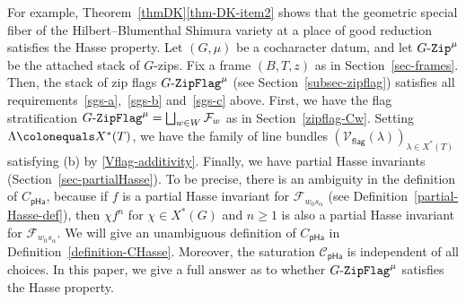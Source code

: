 \documentclass[11pt]{amsart}
\numberwithin{equation}{section}
\theoremstyle{definition}
\theoremstyle{remark}
\newcommand{\GZip}{\mathop{\text{$G$-{\tt Zip}}}\nolimits}
\newcommand{\pha}{\mathsf{pHa}}
\newcommand{\flag}{\mathsf{flag}}
\newcommand{\GF}{\mathop{\text{$G$-{\tt ZipFlag}}}\nolimits}
\newcommand{\Ccal}{{\mathcal C}}
\newcommand{\Fcal}{{\mathcal F}}
\newcommand{\Vcal}{{\mathcal V}}
\begin{document}
For example, Theorem~\ref{thmDK}\eqref{thm-DK-item2} shows that the geometric special fiber of the Hilbert--Blumenthal Shimura variety at a place of good reduction satisfies the Hasse property. Let $(G,\mu)$ be a cocharacter datum, and let $\GZip^\mu$ be the attached stack of $G$-zips. Fix a frame $(B,T,z)$ as in Section~\ref{sec-frames}. 
Then, the stack of zip flags $\GF^\mu$ (see Section~\ref{subsec-zipflag}) satisfies all requirements~\eqref{sgs-a},~\eqref{sgs-b} and~\eqref{sgs-c} above. First, we have the flag stratification $\GF^{\mu}=\bigsqcup_{w\in W}\Fcal_w$ as in Section~\eqref{zipflag-Cw}. Setting $\Lambda \colonequals X^*(T)$, we have the family of line bundles $(\Vcal_{\flag}(\lambda))_{\lambda\in X^*(T)}$ satisfying (b) by \eqref{Vflag-additivity}. Finally, we have partial Hasse invariants (Section~\ref{sec-partialHasse}). 
To be precise, there is an ambiguity in the definition of $C_{\pha}$, because if $f$ is a partial Hasse invariant for $\Fcal_{w_0 s_\alpha}$ (see Definition~\ref{partial-Hasse-def}), then $\chi f^n$ for $\chi \in X^*(G)$ and $n\geq 1$ is also a partial Hasse invariant for $\Fcal_{w_0 s_\alpha}$. We will give an unambiguous definition of $C_{\pha}$ in Definition~\ref{definition-CHasse}. Moreover, the saturation $\Ccal_{\pha}$ is independent of all choices. In this paper, we give a full answer as to whether $\GF^{\mu}$ satisfies the Hasse property.
\end{document}
